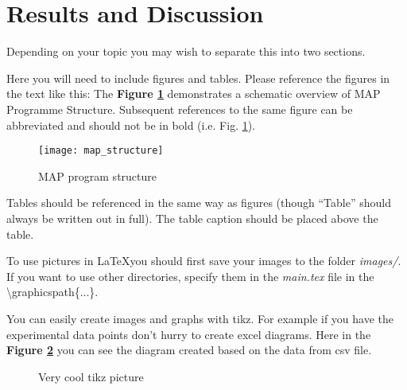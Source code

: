 \section{Results and Discussion}
Depending on your topic you may wish to separate this into two sections.

Here you will need to include figures and tables. Please reference the figures in the text like this: The \textbf{Figure \ref{map_struct}} demonstrates a schematic overview of MAP Programme Structure. Subsequent references to the same figure can be abbreviated and should not be in bold (i.e. Fig. \ref{map_struct}).

\begin{figure}
	\centering
	\texttt{[image: map\_structure]}
	\caption{MAP program structure\cite{map_web}}
	\label{map_struct}
\end{figure}

Tables should be referenced in the same way as figures (though “Table” should always be written out in full). The table caption should be placed above the table.
 
To use pictures in \LaTeX you should first save your images to the folder \textit{images/}. If you want to use other directories, specify them in the \textit{main.tex} file in the \textbackslash graphicspath\{...\}.
 
You can easily create images and graphs with tikz. For example if you have the experimental data points don't hurry to create excel diagrams. Here in the \textbf{Figure \ref{tikypic}} you can see the diagram created based on the data from csv file. 


\begin{figure}
	\centering
	
	\caption{Very cool tikz picture}
	\label{tikypic}
\end{figure}